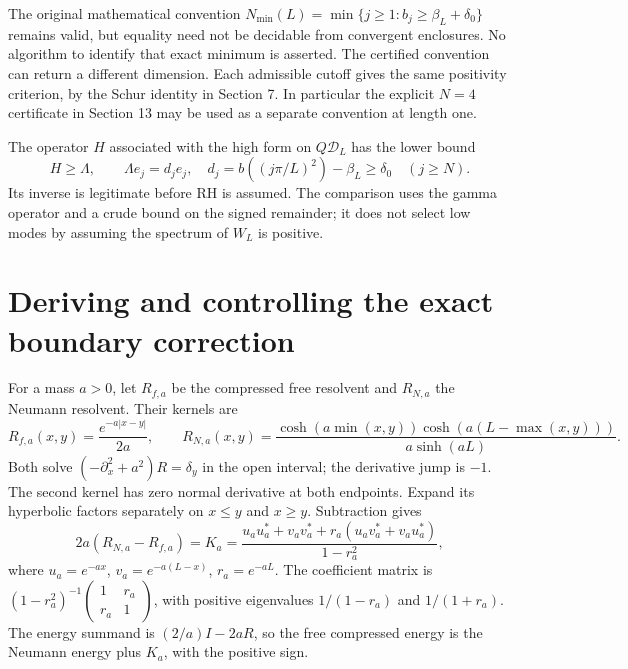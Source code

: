 The original mathematical convention
$N_{\min}(L)=\min\{j\ge1:b_j\ge\beta_L+\delta_0\}$ remains valid,
but equality need not be decidable from convergent enclosures.
No algorithm to identify that exact minimum is asserted.
The certified convention can return a different dimension. Each admissible
cutoff gives the same positivity criterion, by the Schur identity in Section 7.
In particular the explicit $N=4$ certificate in Section 13 may be used
as a separate convention at length one.

The operator $H$ associated with the high form on $Q\mathcal D_L$ has
the lower bound
\[
H\ge\Lambda,\qquad\Lambda e_j=d_je_j,\quad
d_j=b((j\pi/L)^2)-\beta_L\ge\delta_0\quad(j\ge N).
\]
Its inverse is legitimate before RH is assumed. The comparison uses the
gamma operator and a crude bound on the signed remainder; it does not
select low modes by assuming the spectrum of $W_L$ is positive.

\section{Deriving and controlling the exact boundary correction}
For a mass $a>0$, let $R_{f,a}$ be the compressed free resolvent and
$R_{N,a}$ the Neumann resolvent. Their kernels are
\[
R_{f,a}(x,y)=\frac{e^{-a|x-y|}}{2a},\qquad
R_{N,a}(x,y)=\frac{\cosh(a\min(x,y))\cosh(a(L-\max(x,y)))}{a\sinh(aL)}.
\]
Both solve $(-\partial_x^2+a^2)R=\delta_y$ in the open interval;
the derivative jump is $-1$. The second kernel has zero normal derivative
at both endpoints. Expand its hyperbolic factors separately on $x\le y$
and $x\ge y$. Subtraction gives
\begin{equation}\label{d:mass-boundary}
2a(R_{N,a}-R_{f,a})=K_a
=\frac{u_au_a^*+v_av_a^*+r_a(u_av_a^*+v_au_a^*)}{1-r_a^2},
\end{equation}
where $u_a=e^{-ax}$, $v_a=e^{-a(L-x)}$, $r_a=e^{-aL}$.
The coefficient matrix is $(1-r_a^2)^{-1}
\left(\begin{smallmatrix}1&r_a\\r_a&1\end{smallmatrix}\right)$, with
positive eigenvalues $1/(1-r_a)$ and $1/(1+r_a)$.
The energy summand is $(2/a)I-2aR$, so the free compressed energy is
the Neumann energy plus $K_a$, with the positive sign.

